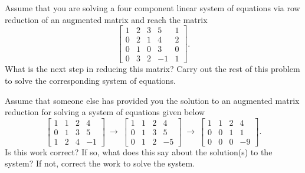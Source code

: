 \begin{exercise}
Assume that you are solving a four component linear system of equations via row reduction of an augmented matrix and reach the matrix
\begin{equation*}
\left[ 
\begin{array}{cccc|c}
1 & 2 & 3 & 5 & 1 \\
0 & 2 & 1 & 4 & 2 \\
0 & 1 & 0 & 3 & 0 \\
0 & 3 & 2 & -1 & 1
\end{array}
\right].
\end{equation*}
What is the next step in reducing this matrix? Carry out the rest of this problem to solve the corresponding system of equations. 
\end{exercise}

\begin{exercise}\ansMark%
Assume that someone else has provided you the solution to an augmented matrix reduction for solving a system of equations given below
\begin{equation*}
\begin{bmatrix}
1 & 1 & 2 & 4 \\
0 & 1 & 3 & 5 \\
1 & 2 & 4 & -1
\end{bmatrix} \ \rightarrow \ \begin{bmatrix} 1 & 1 & 2 & 4 \\ 0 & 1 & 3 & 5 \\ 0 & 1 & 2 & -5 \end{bmatrix} \ \rightarrow \ \begin{bmatrix} 1 & 1 & 2 & 4 \\ 0 & 0 & 1 & 1 \\ 0 & 0 & 0 & -9 \end{bmatrix}.
\end{equation*} 
Is this work correct? If so, what does this say about the solution(s) to the system? If not, correct the work to solve the system.
\end{exercise}

\setcounter{exercise}{100}

